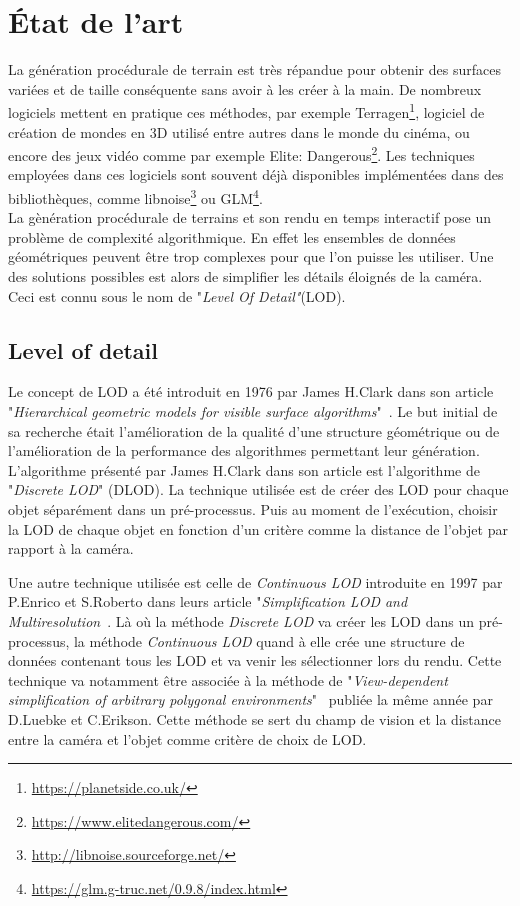 \chapter*{État de l'art}
\setcounter{chapter}{0}

La génération procédurale de terrain est très répandue pour obtenir des
surfaces variées et de taille conséquente sans avoir à les créer à la
main. De nombreux logiciels mettent en pratique ces méthodes, par
exemple Terragen\footnote{\url{https://planetside.co.uk/}}, logiciel de
création de mondes en 3D utilisé entre autres dans le monde du cinéma,
ou encore des jeux vidéo comme par exemple Elite:
Dangerous\footnote{\url{https://www.elitedangerous.com/}}. Les
techniques employées dans ces logiciels sont souvent déjà disponibles
implémentées dans des bibliothèques, comme
libnoise\footnote{\url{http://libnoise.sourceforge.net/}} ou
GLM\footnote{\url{https://glm.g-truc.net/0.9.8/index.html}}.\\

La gènération procédurale de terrains et son rendu en temps interactif pose un problème de complexité algorithmique. En effet les ensembles de données géométriques peuvent être trop complexes pour que l'on puisse les utiliser. Une des solutions possibles est alors de simplifier les détails éloignés de la caméra. Ceci est connu sous le nom de "\emph{Level Of Detail"}(LOD).

\section*{Level of detail}

Le concept de LOD a été introduit en 1976 par James H.Clark dans son article "\emph{Hierarchical geometric models for visible surface algorithms}"~\cite{Clark}. Le but initial de sa recherche était l'amélioration de la qualité d'une structure géométrique ou de l'amélioration de la performance des algorithmes permettant leur génération. L'algorithme présenté par James H.Clark dans son article est l'algorithme de "\emph{Discrete LOD}" (DLOD). La technique utilisée est de créer des LOD pour chaque objet séparément dans un pré-processus. Puis au moment de l'exécution, choisir la LOD de chaque objet en fonction d'un critère comme la distance de l'objet par rapport à la caméra.

Une autre technique utilisée est celle de \emph{Continuous LOD} introduite en 1997 par P.Enrico et S.Roberto dans leurs article "\emph{Simplification LOD and Multiresolution}~\cite{Enrico}. Là où la méthode \emph{Discrete LOD} va créer les LOD dans un pré-processus, la méthode  \emph{Continuous LOD} quand à elle crée une structure de données contenant tous les LOD et va venir les sélectionner lors du rendu. Cette technique va notamment être associée à la méthode de "\emph{View-dependent simplification of
arbitrary polygonal environments}"~\cite{view-dependent} publiée la même année par D.Luebke et C.Erikson. Cette méthode se sert du champ de vision et la distance entre la caméra et l'objet comme critère de choix de LOD.

